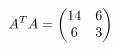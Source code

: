 \documentclass[preview]{standalone}
\begin{document}
\begin{align*}
\special{dvisvgm:raw <g id='unique000'>}A^TA=\begin{pmatrix}14&6\\6&3\end{pmatrix}\special{dvisvgm:raw </g>}
\end{align*}
\end{document}
